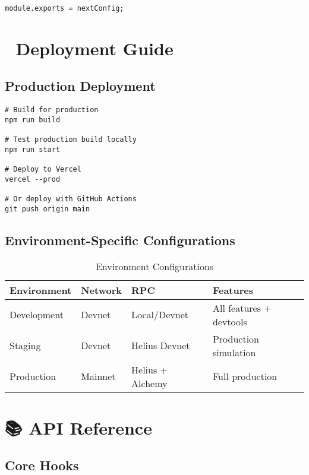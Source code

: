 \documentclass[11pt,a4paper]{article}
\begin{document}
\begin{lstlisting}[style=typescript, caption=Next.js Configuration for Performance]
module.exports = nextConfig;
\end{lstlisting}

\section{🚀 Deployment Guide}

\subsection{Production Deployment}

\begin{lstlisting}[style=bash, caption=Production Build and Deployment]
# Build for production
npm run build

# Test production build locally
npm run start

# Deploy to Vercel
vercel --prod

# Or deploy with GitHub Actions
git push origin main
\end{lstlisting}

\subsection{Environment-Specific Configurations}

\begin{table}[h]
\centering
\begin{tabular}{|l|l|l|l|}
\hline
\textbf{Environment} & \textbf{Network} & \textbf{RPC} & \textbf{Features} \\
\hline
Development & Devnet & Local/Devnet & All features + devtools \\
\hline
Staging & Devnet & Helius Devnet & Production simulation \\
\hline
Production & Mainnet & Helius + Alchemy & Full production \\
\hline
\end{tabular}
\caption{Environment Configurations}
\end{table}

\section{📚 API Reference}

\subsection{Core Hooks}
\end{document}

